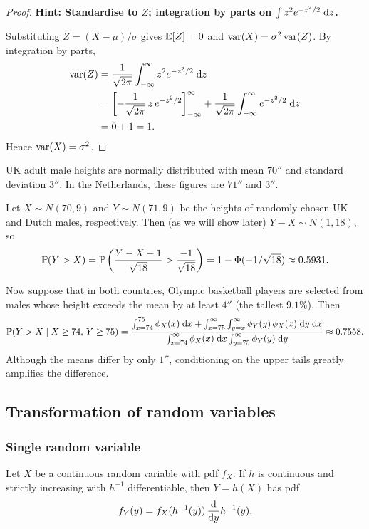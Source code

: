 \documentclass[a4paper]{article}
\begin{document}
\begin{proof}
  \textbf{Hint: Standardise to $Z$; integration by parts on $\int z^2 e^{-z^2/2}\;\d z$.}

  Substituting $Z = (X - \mu)/\sigma$ gives $\E[Z] = 0$ and $\var(X) = \sigma^2 \var(Z)$.
  By integration by parts,
  \begin{align*}
    \var(Z) &= \frac{1}{\sqrt{2\pi}} \int_{-\infty}^\infty z^2 e^{-z^2/2}\;\d z\\
    &= \left[-\frac{1}{\sqrt{2\pi}}\,z\,e^{-z^2/2}\right]_{-\infty}^\infty + \frac{1}{\sqrt{2\pi}}\int_{-\infty}^\infty e^{-z^2/2}\;\d z\\
    &= 0 + 1 = 1.
  \end{align*}
  Hence $\var(X) = \sigma^2$.
\end{proof}

\begin{eg}
  UK adult male heights are normally distributed with mean $70''$ and standard deviation $3''$.
  In the Netherlands, these figures are $71''$ and $3''$.

  Let $X \sim N(70, 9)$ and $Y \sim N(71, 9)$ be the heights of randomly chosen UK and Dutch males, respectively.
  Then (as we will show later) $Y - X \sim N(1, 18)$, so
  \[
    \P(Y > X) = \P\left(\frac{Y - X - 1}{\sqrt{18}} > \frac{-1}{\sqrt{18}}\right) = 1 - \Phi(-1/\sqrt{18}) \approx 0.5931.
  \]

  Now suppose that in both countries, Olympic basketball players are selected from males whose height exceeds the mean by at least $4''$ (the tallest $9.1\%$).
  Then
  \[
    \P(Y > X \mid X \geq 74,\, Y \geq 75) = \frac{\int_{x = 74}^{75} \phi_X(x)\;\d x + \int_{x = 75}^\infty \int_{y=x}^\infty \phi_Y(y)\,\phi_X(x)\;\d y\;\d x}{\int_{x=74}^\infty \phi_X(x)\;\d x \int_{y=75}^\infty \phi_Y(y)\;\d y} \approx 0.7558.
  \]
  Although the means differ by only $1''$, conditioning on the upper tails greatly amplifies the difference.
\end{eg}

\subsection{Transformation of random variables}
\subsubsection*{Single random variable}
\begin{thm}
  Let $X$ be a continuous random variable with pdf $f_X$.
  If $h$ is continuous and strictly increasing with $h^{-1}$ differentiable, then $Y = h(X)$ has pdf
  \[
    f_Y(y) = f_X(h^{-1}(y))\,\frac{\d}{\d y}h^{-1}(y).
  \]
\end{thm}
\end{document}

